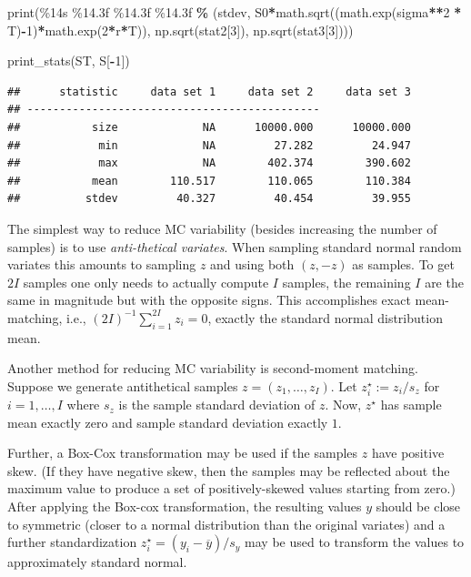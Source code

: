 \documentclass[
]{book}
\newenvironment{Shaded}{\begin{snugshade}}{\end{snugshade}}
\newcommand{\BuiltInTok}[1]{#1}
\newcommand{\DecValTok}[1]{\textcolor[rgb]{0.00,0.00,0.81}{#1}}
\newcommand{\NormalTok}[1]{#1}
\newcommand{\OperatorTok}[1]{\textcolor[rgb]{0.81,0.36,0.00}{\textbf{#1}}}
\newcommand{\SpecialCharTok}[1]{\textcolor[rgb]{0.00,0.00,0.00}{#1}}
\newcommand{\StringTok}[1]{\textcolor[rgb]{0.31,0.60,0.02}{#1}}
\begin{document}
\begin{Shaded}
\begin{Highlighting}[]
    \BuiltInTok{print}\NormalTok{(}\StringTok{\textquotesingle{}}\SpecialCharTok{\%14s}\StringTok{ }\SpecialCharTok{\%14.3f}\StringTok{ }\SpecialCharTok{\%14.3f}\StringTok{ }\SpecialCharTok{\%14.3f}\StringTok{\textquotesingle{}} \OperatorTok{\%}\NormalTok{ (}\StringTok{\textquotesingle{}stdev\textquotesingle{}}\NormalTok{, S0}\OperatorTok{*}\NormalTok{math.sqrt((math.exp(sigma}\OperatorTok{**}\DecValTok{2} \OperatorTok{*}\NormalTok{ T)}\OperatorTok{{-}}\DecValTok{1}\NormalTok{)}\OperatorTok{*}\NormalTok{math.exp(}\DecValTok{2}\OperatorTok{*}\NormalTok{r}\OperatorTok{*}\NormalTok{T)), np.sqrt(stat2[}\DecValTok{3}\NormalTok{]), np.sqrt(stat3[}\DecValTok{3}\NormalTok{])))}


\NormalTok{print\_stats(ST, S[}\OperatorTok{{-}}\DecValTok{1}\NormalTok{])}
\end{Highlighting}
\end{Shaded}

\begin{verbatim}
##      statistic     data set 1     data set 2     data set 3
## ---------------------------------------------
##           size             NA      10000.000      10000.000
##            min             NA         27.282         24.947
##            max             NA        402.374        390.602
##           mean        110.517        110.065        110.384
##          stdev         40.327         40.454         39.955
\end{verbatim}

The simplest way to reduce MC variability (besides increasing the number of samples) is to use \emph{anti-thetical variates}. When sampling standard normal random variates this amounts to sampling \(z\) and using both \((z,-z)\) as samples. To get \(2I\) samples one only needs to actually compute \(I\) samples, the remaining \(I\) are the same in magnitude but with the opposite signs. This accomplishes exact mean-matching, i.e., \((2I)^{-1}\sum_{i=1}^{2I} z_i = 0\), exactly the standard normal distribution mean.

Another method for reducing MC variability is second-moment matching. Suppose we generate antithetical samples \(z = (z_1, \ldots, z_I)\). Let \(z^\star_i := z_i / s_{z}\) for \(i=1, \ldots, I\) where \(s_z\) is the sample standard deviation of \(z\). Now, \(z^\star\) has sample mean exactly zero and sample standard deviation exactly \(1\).

Further, a Box-Cox transformation may be used if the samples \(z\) have positive skew. (If they have negative skew, then the samples may be reflected about the maximum value to produce a set of positively-skewed values starting from zero.) After applying the Box-cox transformation, the resulting values \(y\) should be close to symmetric (closer to a normal distribution than the original variates) and a further standardization \(z^\star_i = (y_i - \overline y)/s_y\) may be used to transform the values to approximately standard normal.
\end{document}
